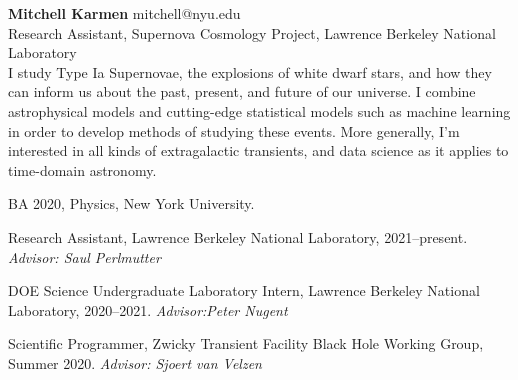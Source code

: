 \documentclass[12pt,letterpaper]{article}
\begin{document}
\thispagestyle{empty}\sloppy\sloppypar\raggedbottom

\textbf{\Large Mitchell Karmen} \hfill
\textsf{\small mitchell@nyu.edu} \\[0.5ex] %
Research Assistant, Supernova Cosmology Project, Lawrence Berkeley National Laboratory\\[0.5ex]
\vspace{\medskip}
I study Type Ia Supernovae, the explosions of white dwarf stars, and how they can inform us about the past, present, and future of our universe.  I combine astrophysical models and cutting-edge statistical models such as machine learning in order to develop methods of studying these events.  More generally, I'm interested in all kinds of extragalactic transients, and data science as it applies to time-domain astronomy.

\begin{list}{}{\cvlist}
  \item
        BA 2020, Physics, New York University.
\end{list}

\begin{list}{}{\cvlist}
  \item
        Research Assistant, Lawrence Berkeley National Laboratory, 2021--present. \textit{Advisor: Saul Perlmutter}
  \item
        DOE Science Undergraduate Laboratory Intern, Lawrence Berkeley National Laboratory, 2020--2021. \textit{Advisor:Peter Nugent}
  \item
        Scientific Programmer, Zwicky Transient Facility Black Hole Working Group, Summer 2020. \textit{Advisor: Sjoert van Velzen}
\end{list}
\end{document}
